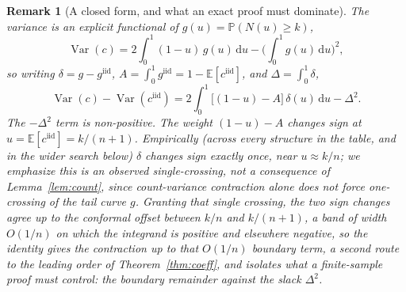 \documentclass[11pt]{article}
\newtheorem{remark}{Remark}
\begin{document}
\begin{remark}[A closed form, and what an exact proof must dominate]
The variance is an explicit functional of $g(u)=\mathbb P(N(u)\ge k)$,
\begin{equation}
\operatorname{Var}(c)=2\int_0^1(1-u)\,g(u)\,\mathrm du-\Big(\int_0^1 g(u)\,\mathrm du\Big)^{\!2},
\end{equation}
so writing $\delta=g-g^{\mathrm{iid}}$, $A=\int_0^1 g^{\mathrm{iid}}=1-\mathbb E[c^{\mathrm{iid}}]$,
and $\Delta=\int_0^1\delta$,
\begin{equation}
\operatorname{Var}(c)-\operatorname{Var}(c^{\mathrm{iid}})
=2\int_0^1\big[(1-u)-A\big]\,\delta(u)\,\mathrm du-\Delta^2 .
\end{equation}
The $-\Delta^2$ term is non-positive. The weight $(1-u)-A$ changes sign at
$u=\mathbb E[c^{\mathrm{iid}}]=k/(n+1)$. Empirically (across every structure in the table, and in the
wider search below) $\delta$ changes sign exactly once, near $u\approx k/n$; we emphasize this is an
\emph{observed} single-crossing, not a consequence of Lemma~\ref{lem:count}, since count-variance
contraction alone does not force one-crossing of the tail curve $g$. \emph{Granting} that single
crossing, the two sign changes agree up to the conformal offset between $k/n$ and $k/(n+1)$, a band of
width $O(1/n)$ on which the integrand is positive and elsewhere negative, so the identity gives the
contraction up to that $O(1/n)$ boundary term, a second route to the leading order of
Theorem~\ref{thm:coeff}, and isolates what a finite-sample proof must control: the boundary remainder
against the slack $\Delta^2$.
\end{remark}
\end{document}
